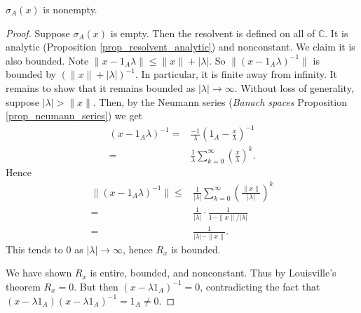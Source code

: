\documentclass[12pt]{article}
\begin{document}
\begin{theorem}
	$\sigma_A(x)$ is nonempty.
\end{theorem}
\begin{proof}
	Suppose $\sigma_A(x)$ is empty. Then the resolvent is defined on all of $\mathbb{C}$. It is analytic (Proposition \ref{prop_resolvent_analytic}) and nonconstant. We claim it is also bounded. Note $\|x - 1_A\lambda\| \leq \|x\| + |\lambda|$. So $\|(x-1_A\lambda)^{-1}\|$ is bounded by $(\|x\| + |\lambda|)^{-1}$. In particular, it is finite away from infinity. It remains to show that it remains bounded as $|\lambda|\to\infty$. Without loss of generality, suppose $|\lambda|>\|x\|$. Then, by the Neumann series (\textit{Banach spaces} Proposition \ref{prop_neumann_series}) we get 
	\begin{align*}
		(x-1_A\lambda)^{-1} 
		=& \frac{-1}{\lambda} \left( 1_A - \frac{x}{\lambda} \right)^{-1} \\
		=& \frac{1}{\lambda} \sum_{k=0}^\infty \left(\frac{x}{\lambda}\right)^k.
	\end{align*}
	Hence
	\begin{align*}
		\|(x-1_A\lambda)^{-1}\|
		\leq& \frac{1}{|\lambda|} \sum_{k=0}^\infty \left( \frac{\|x\|}{|\lambda|}\right)^k \\
		=& \frac{1}{|\lambda|} \cdot \frac{1}{1 - \|x\|/|\lambda|} \\
		=& \frac{1}{|\lambda| - \|x\|}.
	\end{align*}
	This tends to 0 as $|\lambda|\to\infty$, hence $R_x$ is bounded.

	We have shown $R_x$ is entire, bounded, and nonconstant. Thus by Louisville's theorem  $R_x=0$. But then $(x-\lambda 1_A)^{-1}=0$, contradicting the fact that $(x-\lambda 1_A)(x-\lambda 1_A)^{-1} = 1_A \neq 0$.
\end{proof}
\end{document}
